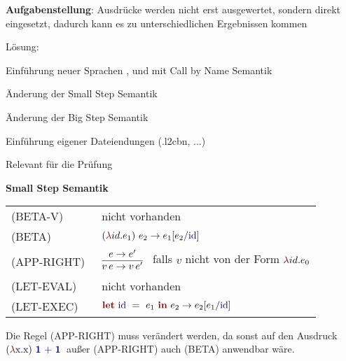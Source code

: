 {
  \textbf{Aufgabenstellung}: Ausdrücke werden nicht erst ausgewertet, sondern direkt eingesetzt,
  dadurch kann es zu unterschiedlichen Ergebnissen kommen

  {
    \begin{itemgroup}{Lösung:}
      \item Einführung neuer Sprachen \LZEROCBN, \LONECBN und \LTWOCBN  mit Call by Name Semantik
      \item Änderung der Small Step Semantik
      \item Änderung der Big Step Semantik
      \item Einführung eigener Dateiendungen (.l2cbn, ...)
      \item Relevant für die Prüfung \glqq \TPONE \grqq
    \end{itemgroup}
  }
}


{
  {\bf Small Step Semantik}\\[5mm]
  \begin{tabular}{ll}
     \mbox{(BETA-V)}      & nicht vorhanden \\[3mm]
     \mbox{(BETA)}        & $\ExprApplication{\Parenthesis{\ExprLambda{id}{}{e_1}}}{e_2} \to
                                               e_1[e_2/\ExprIdentifier{id}]$ \\[3mm]
     \mbox{(APP-RIGHT)\ } & $\smallsteprule{e \to e'}
                              {v\,e \to v\,e'}$ \ 
                              falls ${v}$ nicht von der Form $\ExprLambda{id}{}{e_0}$ \\[5mm]
     \mbox{(LET-EVAL)\  } & nicht vorhanden \\[3mm]
     \mbox{(LET-EXEC)}    & $\ExprLet{\ExprIdentifier{id}}{}{e_1}{e_2} \to
                                      e_2[e_1/\ExprIdentifier{id}]$ \\[3mm]
  \end{tabular}

  {
    Die Regel (APP-RIGHT) muss verändert werden, da sonst auf den Ausdruck \glqq
    $\ExprApplication{\Parenthesis{\ExprLambda{\ExprIdentifier{x}}{}{\ExprIdentifier{x}}}}
    {\ExprInfixOperation{\ExprBinaryOperator{+}}{\ExprConstant{1}}{\ExprConstant{1}}}$\grqq\ 
    außer (APP-RIGHT) auch (BETA) anwendbar wäre.
  }
}


